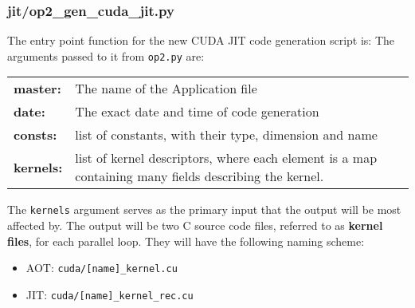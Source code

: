 \subsubsection{jit/op2\_gen\_cuda\_jit.py}
The entry point function for the new CUDA JIT code generation script is:
\noindent The arguments passed to it from \verb|op2.py| are:
\begin{center}
\begin{tabular}{>{\bfseries}l l}
master: & The name of the Application file \\[\medskipamount]
date: & The exact date and time of code generation \\[\medskipamount]
consts: & list of constants, with their type, dimension and name \\[\medskipamount]
kernels: & \parbox[t]{.8\textwidth}{list of kernel descriptors, where each element is a map containing many fields describing the kernel.} \\[\medskipamount]
\end{tabular}
\end{center}
\vspace{1em}
\noindent The \verb|kernels| argument serves as the primary input that the output will be most affected by. The output will be two C source code files, referred to as \textbf{kernel files}, for each parallel loop. They will have the following naming scheme:
\begin{itemize}
\vspace{-.5em}
\item{AOT: \verb|cuda/[name]_kernel.cu|}
\vspace{-.5em}
\item{JIT: \verb|cuda/[name]_kernel_rec.cu|}
\end{itemize}

